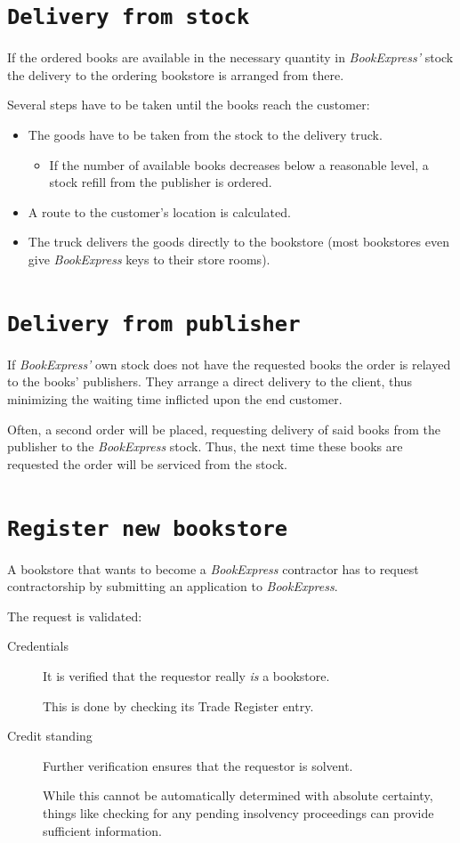 \section{\texttt{Delivery from stock}}
If the ordered books are available in the necessary quantity in \emph{BookExpress'} stock the delivery to the ordering bookstore is
arranged from there.

Several steps have to be taken until the books reach the customer:
\begin{itemize}
	\item The goods have to be taken from the stock to the delivery truck.
		\begin{itemize}
			\item If the number of available books decreases below a reasonable level, a stock refill from the publisher is ordered.
		\end{itemize}
	\item A route to the customer's location is calculated.
	\item The truck delivers the goods directly to the bookstore (most bookstores even give \emph{BookExpress} keys to their store rooms).
\end{itemize}


\section{\texttt{Delivery from publisher}}                             
If \emph{BookExpress'} own stock does not have the requested books the order is relayed to the books' publishers. They arrange a direct delivery
to the client, thus minimizing the waiting time inflicted upon the end customer.

Often, a second order will be placed, requesting delivery of said books from the publisher to the \emph{BookExpress} stock. Thus, the next time these
books are requested the order will be serviced from the stock.


\section{\texttt{Register new bookstore}}
A bookstore that wants to become a \emph{BookExpress} contractor has to request contractorship by submitting an application to \emph{BookExpress}.

The request is validated:
\begin{description}
	\item[Credentials] It is verified that the requestor really \emph{is} a bookstore.

	                   This is done by checking its Trade Register entry.
	\item[Credit standing] Further verification ensures that the requestor is solvent.

	                       While this cannot be automatically determined with absolute certainty, things like checking for any pending
						   insolvency proceedings can provide sufficient information.
\end{description}


